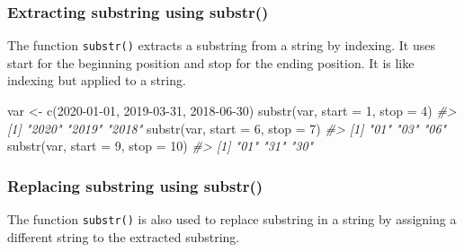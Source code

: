 \documentclass[
]{book}
\newenvironment{Shaded}{\begin{snugshade}}{\end{snugshade}}
\newcommand{\AttributeTok}[1]{\textcolor[rgb]{0.77,0.63,0.00}{#1}}
\newcommand{\CommentTok}[1]{\textcolor[rgb]{0.56,0.35,0.01}{\textit{#1}}}
\newcommand{\DecValTok}[1]{\textcolor[rgb]{0.00,0.00,0.81}{#1}}
\newcommand{\FunctionTok}[1]{\textcolor[rgb]{0.00,0.00,0.00}{#1}}
\newcommand{\NormalTok}[1]{#1}
\newcommand{\OtherTok}[1]{\textcolor[rgb]{0.56,0.35,0.01}{#1}}
\newcommand{\StringTok}[1]{\textcolor[rgb]{0.31,0.60,0.02}{#1}}
\begin{document}
\hypertarget{extracting-substring-using-substr}{%
\subsubsection{Extracting substring using substr()}\label{extracting-substring-using-substr}}

The function \texttt{substr()} extracts a substring from a string by indexing. It uses start for the beginning position and stop for the ending position. It is like indexing but applied to a string.

\begin{Shaded}
\begin{Highlighting}[]
\NormalTok{var }\OtherTok{\textless{}{-}} \FunctionTok{c}\NormalTok{(}\StringTok{\textquotesingle{}2020{-}01{-}01\textquotesingle{}}\NormalTok{, }\StringTok{\textquotesingle{}2019{-}03{-}31\textquotesingle{}}\NormalTok{, }\StringTok{\textquotesingle{}2018{-}06{-}30\textquotesingle{}}\NormalTok{)}
\FunctionTok{substr}\NormalTok{(var, }\AttributeTok{start =} \DecValTok{1}\NormalTok{, }\AttributeTok{stop =} \DecValTok{4}\NormalTok{)}
\CommentTok{\#\textgreater{} [1] "2020" "2019" "2018"}
\FunctionTok{substr}\NormalTok{(var, }\AttributeTok{start =} \DecValTok{6}\NormalTok{, }\AttributeTok{stop =} \DecValTok{7}\NormalTok{)}
\CommentTok{\#\textgreater{} [1] "01" "03" "06"}
\FunctionTok{substr}\NormalTok{(var, }\AttributeTok{start =} \DecValTok{9}\NormalTok{, }\AttributeTok{stop =} \DecValTok{10}\NormalTok{)}
\CommentTok{\#\textgreater{} [1] "01" "31" "30"}
\end{Highlighting}
\end{Shaded}

\hypertarget{replacing-substring-using-substr}{%
\subsubsection{Replacing substring using substr()}\label{replacing-substring-using-substr}}

The function \texttt{substr()} is also used to replace substring in a string by assigning a different string to the extracted substring.
\end{document}
